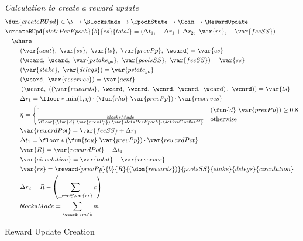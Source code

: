 \begin{figure}[htb]
  \emph{Calculation to create a reward update}
  \begin{align*}
    & \fun{createRUpd} \in \N \to \BlocksMade \to \EpochState \to \Coin \to \RewardUpdate \\
    & \createRUpd{slotsPerEpoch}{b}{es}{total} = \left(
      \Delta t_1,-~\Delta r_1+\Delta r_2,~\var{rs},~-\var{feeSS}\right) \\
    & ~~~\where \\
    & ~~~~~~~(\var{acnt},~\var{ss},~\var{ls},~\var{prevPp},~\wcard) = \var{es} \\
    & ~~~~~~~(\wcard,~\wcard,~\var{pstake_{go}},~\var{poolsSS},~\var{feeSS}) = \var{ss}\\
    & ~~~~~~~(\var{stake},~\var{delegs}) = \var{pstate_{go}} \\
    & ~~~~~~~(\wcard,~\var{reserves}) = \var{acnt} \\
    & ~~~~~~~\left(
      \wcard,~
      \left(
      \left(\var{rewards},~\wcard,~\wcard,~\wcard,~\wcard,~\wcard\right),~
      \wcard
      \right)
      \right) = \var{ls} \\
    & ~~~~~~~\Delta r_1 = \floor*{\min(1,\eta) \cdot (\fun{rho}~\var{prevPp}) \cdot
      \var{reserves}}
    \\
    & ~~~~~~~\eta =
      \begin{cases}
        1 & (\fun{d}~\var{prevPp})\geq 0.8 \\
        \frac{blocksMade}{\floor{(\fun{d}~\var{prevPp})\cdot\var{slotsPerEpoch} \cdot \ActiveSlotCoeff}}
          & \text{otherwise} \\
      \end{cases} \\
    & ~~~~~~~\var{rewardPot} = \var{feeSS} + \Delta r_1 \\
    & ~~~~~~~\Delta t_1 = \floor*{(\fun{tau}~\var{prevPp}) \cdot \var{rewardPot}} \\
    & ~~~~~~~\var{R} = \var{rewardPot} - \Delta t_1 \\
    & ~~~~~~~\var{circulation} = \var{total} - \var{reserves} \\
    & ~~~~~~~\var{rs}
      = \reward{prevPp}{b}{R}{(\dom{rewards})}{poolsSS}{stake}{delegs}{circulation} \\
    & ~~~~~~~\Delta r_{2} = R - \left(\sum\limits_{\_\mapsto c\in\var{rs}}c\right) \\
    & ~~~~~~~blocksMade = \sum_{\wcard \mapsto m \in b}m
  \end{align*}

  \caption{Reward Update Creation}
  \label{fig:functions:reward-update-creation}
\end{figure}


